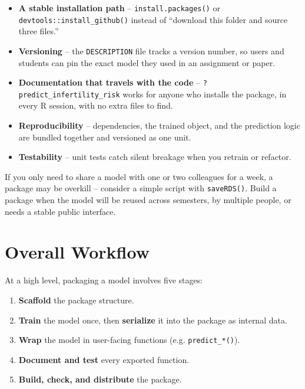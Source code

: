 \documentclass[11pt]{article}
\begin{document}
\begin{itemize}[itemsep=2pt]
  \item \textbf{A stable installation path} -- \texttt{install.packages()} or \texttt{devtools::install\_github()} instead of ``download this folder and source three files.''
  \item \textbf{Versioning} -- the \texttt{DESCRIPTION} file tracks a version number, so users and students can pin the exact model they used in an assignment or paper.
  \item \textbf{Documentation that travels with the code} -- \texttt{?predict\_infertility\_risk} works for anyone who installs the package, in every R session, with no extra files to find.
  \item \textbf{Reproducibility} -- dependencies, the trained object, and the prediction logic are bundled together and versioned as one unit.
  \item \textbf{Testability} -- unit tests catch silent breakage when you retrain or refactor.
\end{itemize}

\begin{tipbox}
If you only need to share a model with one or two colleagues for a week, a package may be overkill -- consider a simple script with \texttt{saveRDS()}. Build a package when the model will be reused across semesters, by multiple people, or needs a stable public interface.
\end{tipbox}

\section{Overall Workflow}

At a high level, packaging a model involves five stages:

\begin{enumerate}[itemsep=3pt]
  \item \textbf{Scaffold} the package structure.
  \item \textbf{Train} the model once, then \textbf{serialize} it into the package as internal data.
  \item \textbf{Wrap} the model in user-facing functions (e.g. \texttt{predict\_*()}).
  \item \textbf{Document and test} every exported function.
  \item \textbf{Build, check, and distribute} the package.
\end{enumerate}
\end{document}
